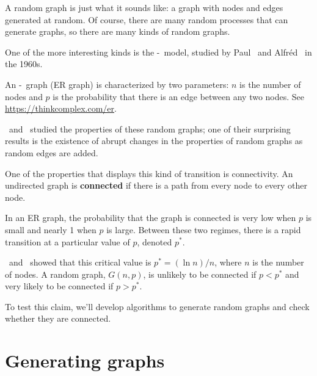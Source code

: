 \documentclass[12pt]{book}
\theoremstyle{exercise}
\begin{document}
A random graph is just what it sounds like: a graph with nodes and edges
generated at random.  Of course, there are many random processes that
can generate graphs, so there are many kinds of random graphs.


One of the more interesting kinds is the \Erdos-\Renyi~model, studied
by Paul \Erdos~and Alfr\'{e}d \Renyi~in the 1960s.


An \Erdos-\Renyi~graph (ER graph) is characterized by two parameters:
$n$ is the number of nodes and $p$ is the probability that there
is an edge between any two nodes.
See \url{https://thinkcomplex.com/er}.


\Erdos~and \Renyi~studied the properties of these random graphs;
one of their surprising results is the existence of
abrupt changes in the properties of random graphs as
random edges are added.


One of the properties that displays this kind of transition is
connectivity.  An undirected graph is {\bf connected} if there is a
path from every node to every other node.


In an ER graph, the probability that the graph is connected is very
low when $p$ is small and nearly 1 when $p$ is large.  Between these
two regimes, there is a rapid transition at a particular value of
$p$, denoted $p^*$.


\Erdos~and \Renyi~showed that this critical value is
$p^* = (\ln n) / n$, where $n$ is the number of nodes.
A random graph, $G(n, p)$, is unlikely to be connected
if $p < p^*$ and very likely to be connected if $p > p^*$.


To test this claim, we'll develop algorithms to generate random
graphs and check whether they are connected.


\section{Generating graphs}
\label{generating}
\end{document}
